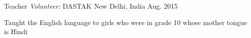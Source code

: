 


\begin{cventries}




\cventry
{Teacher} %
{\textit{Volunteer:} DASTAK} %
{New Delhi, India} %
{Aug. 2015} %
{ %
\begin{cvitems}
\item {Taught the English language to girls who were in grade 10 whose mother tongue is Hindi}
\end{cvitems}
}


\end{cventries}